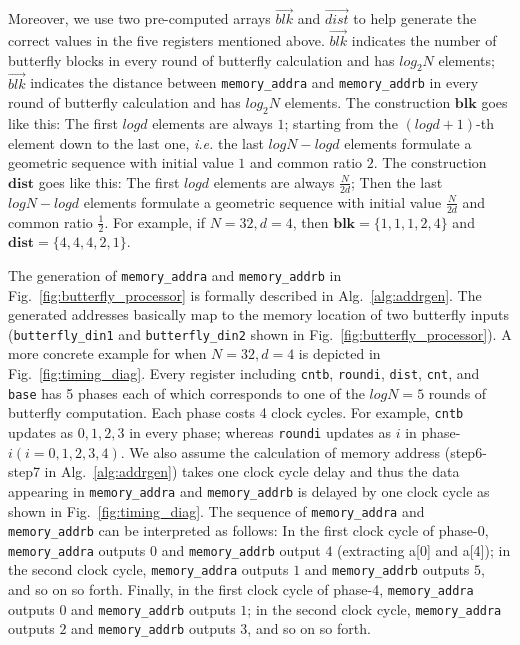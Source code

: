 \documentclass[submission]{iacrtrans}
\theoremstyle{plain}
\begin{document}
Moreover, we use two pre-computed arrays $\vec{blk}$ and $\vec{dist}$ to help generate the correct values in the five registers mentioned above. $\vec{blk}$ indicates the number of butterfly blocks in every round of butterfly calculation and has $log_2N$ elements; $\vec{blk}$ indicates the distance between \texttt{memory\_addra} and \texttt{memory\_addrb} in every round of butterfly calculation and has $log_2N$ elements. The construction $\mathbf{blk}$ goes like this: The first $logd$ elements are always $1$; starting from the $(logd+1)$-th element down to the last one, \textit{i.e.} the last $logN-logd$ elements formulate a geometric sequence with initial value $1$ and common ratio $2$. The construction $\mathbf{dist}$ goes like this: The first $logd$ elements are always $\frac{N}{2d}$; Then the last $logN-logd$ elements formulate a geometric sequence with initial value $\frac{N}{2d}$ and common ratio $\frac{1}{2}$.
For example, if $N=32, d=4$, then $\mathbf{blk}=\{1,1,1,2,4\}$ and $\mathbf{dist}=\{4,4,4,2,1\}$.


The generation of \texttt{memory\_addra} and \texttt{memory\_addrb} in Fig.~\ref{fig:butterfly_processor} is formally described in Alg.~\ref{alg:addrgen}. The generated addresses basically map to the memory location of two butterfly inputs (\texttt{butterfly\_din1} and  \texttt{butterfly\_din2} shown in Fig.~\ref{fig:butterfly_processor}). A more concrete example for when $N=32,d=4$ is depicted in Fig.~\ref{fig:timing_diag}. Every register including \texttt{cntb}, \texttt{roundi}, \texttt{dist}, \texttt{cnt}, and \texttt{base} has 5 phases each of which corresponds to one of the $logN=5$ rounds of butterfly computation. Each phase costs 4 clock cycles. For example, \texttt{cntb} updates as $0,1,2,3$ in every phase; whereas \texttt{roundi} updates as $i$ in phase-$i(i=0,1,2,3,4)$. We also assume the calculation of memory address (step6-step7 in Alg.~\ref{alg:addrgen}) takes one clock cycle delay and thus the data appearing in \texttt{memory\_addra} and \texttt{memory\_addrb} is delayed by one clock cycle as shown in Fig.~\ref{fig:timing_diag}. The sequence of \texttt{memory\_addra} and \texttt{memory\_addrb} can be interpreted as follows: In the first clock cycle of phase-0, \texttt{memory\_addra} outputs $0$ and \texttt{memory\_addrb} output $4$ (extracting a[0] and a[4]); in the second clock cycle, \texttt{memory\_addra} outputs $1$ and \texttt{memory\_addrb} outputs $5$, and so on so forth. Finally, in the first clock cycle of phase-4, \texttt{memory\_addra} outputs $0$ and \texttt{memory\_addrb} outputs $1$; in the second clock cycle, \texttt{memory\_addra} outputs $2$ and \texttt{memory\_addrb} outputs $3$, and so on so forth. 
\end{document}
